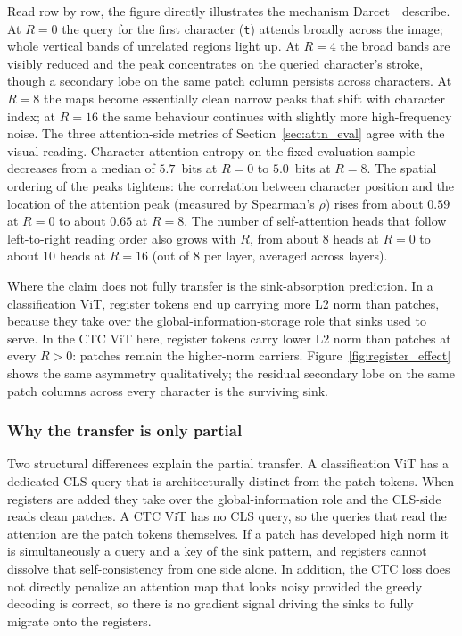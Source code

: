 Read row by row, the figure directly illustrates the mechanism Darcet~\etal\ describe. At $R = 0$ the query for the first character (\texttt{t}) attends broadly across the image; whole vertical bands of unrelated regions light up. At $R = 4$ the broad bands are visibly reduced and the peak concentrates on the queried character's stroke, though a secondary lobe on the same patch column persists across characters. At $R = 8$ the maps become essentially clean narrow peaks that shift with character index; at $R = 16$ the same behaviour continues with slightly more high-frequency noise. The three attention-side metrics of Section~\ref{sec:attn_eval} agree with the visual reading. Character-attention entropy on the fixed evaluation sample decreases from a median of $5.7$~bits at $R = 0$ to $5.0$~bits at $R = 8$. The spatial ordering of the peaks tightens: the correlation between character position and the location of the attention peak (measured by Spearman's $\rho$) rises from about $0.59$ at $R = 0$ to about $0.65$ at $R = 8$. The number of self-attention heads that follow left-to-right reading order also grows with $R$, from about $8$ heads at $R = 0$ to about $10$ heads at $R = 16$ (out of $8$ per layer, averaged across layers).

Where the claim does not fully transfer is the sink-absorption prediction. In a classification ViT, register tokens end up carrying more L2 norm than patches, because they take over the global-information-storage role that sinks used to serve. In the CTC ViT here, register tokens carry lower L2 norm than patches at every $R > 0$: patches remain the higher-norm carriers. Figure~\ref{fig:register_effect} shows the same asymmetry qualitatively; the residual secondary lobe on the same patch columns across every character is the surviving sink.

\subsubsection{Why the transfer is only partial}

Two structural differences explain the partial transfer. A classification ViT has a dedicated CLS query that is architecturally distinct from the patch tokens. When registers are added they take over the global-information role and the CLS-side reads clean patches. A CTC ViT has no CLS query, so the queries that read the attention are the patch tokens themselves. If a patch has developed high norm it is simultaneously a query and a key of the sink pattern, and registers cannot dissolve that self-consistency from one side alone. In addition, the CTC loss does not directly penalize an attention map that looks noisy provided the greedy decoding is correct, so there is no gradient signal driving the sinks to fully migrate onto the registers.

